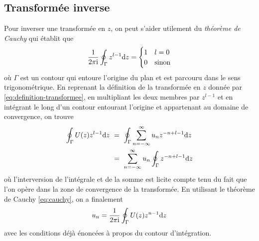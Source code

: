\begin{proposition}
{\subsection{Transformée inverse}
Pour inverser une transform\'{e}e en $z$, on peut s'aider utilement du \emph{théorème de Cauchy} qui \'{e}tablit que
\begin{equation}
\label{eq:cauchy}
\frac{1}{2\pi \mathrm{i}}\oint_{\Gamma}z^{l-1}\mathrm{d}  z= \begin{cases} 1 & l= 0 \\ 0 & \text{sinon} \end{cases}
\end{equation}
o\`{u} $\Gamma$ est un contour qui entoure l'origine du plan et est parcouru dans le sens trigonométrique. En reprenant la d\'{e}finition de la transform\'{e}e en $z$ donn\'{e}e par \eqref{eq:definition-transformee}, en multipliant les deux membres par $z^{l-1}$ et en int\'{e}grant le long d'un contour entourant l'origine et appartenant au domaine de convergence, on trouve
\begin{align*}
\oint_{\Gamma}U(z)z^{l-1}\rmd z\ &=\ \oint_{\Gamma}\sum_{n=-\infty}^{\infty} u_n z^{-n+l-1}\rmd z \\
&=\ \sum_{n=-\infty}^{\infty} u_n \oint_{\Gamma}z^{-n+l-1}\rmd z
\end{align*}
o\`{u} l'interversion de l'int\'{e}grale et de la somme est licite compte tenu du fait que l'on op\`{e}re dans la zone de convergence de la transform\'{e}e. En utilisant le th\'{e}or\`{e}me de Cauchy \eqref{eq:cauchy}, on a finalement
\begin{equation}
\label{eq:inverse-z}
u_n=\frac{1}{2\pi \mathrm{i}}\oint_{\Gamma} U(z)z^{n-1}\mathrm{d} z
\end{equation}
avec les conditions d\'{e}j\`{a} \'{e}nonc\'{e}es \`{a} propos du contour d'int\'{e}gration.

}
\end{proposition}
